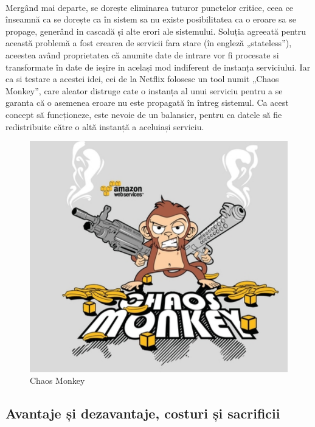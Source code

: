\documentclass[12pt]{report}
\begin{document}
	\paragraph{}Mergând mai departe, se dorește eliminarea tuturor punctelor critice, ceea ce înseamnă ca se dorește ca în sistem sa nu existe posibilitatea ca o eroare sa se propage, generând in cascadă și alte erori ale sistemului. Soluția agreeată pentru această problemă a fost crearea de servicii fara stare (în engleză „stateless”), aceestea având proprietatea că anumite date de intrare vor fi procesate si transformate în date de ieșire in același mod indiferent de instanța serviciului. Iar ca si testare a acestei idei, cei de la Netflix folosesc un tool numit „Chaos Monkey”, care aleator distruge cate o instanța al unui serviciu pentru a se garanta că o asemenea eroare nu este propagată în întreg sistemul. Ca acest concept să funcționeze, este nevoie de un balansier, pentru ca datele să fie redistribuite către o altă instanță a aceluiași serviciu.
	\begin{figure}[h]
  	\centering
  	\includegraphics[scale=.5]{chaos}
	\caption{Chaos Monkey \cite{ruslan}}  
	\label{chaosMonkey}
  	\end{figure}
	\subsection{Avantaje și dezavantaje, costuri și sacrificii}
\end{document}
